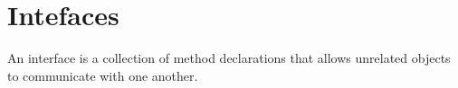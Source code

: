 \section{Intefaces}

%
An interface is a collection of method declarations 
that allows unrelated objects to communicate with one 
another. 

